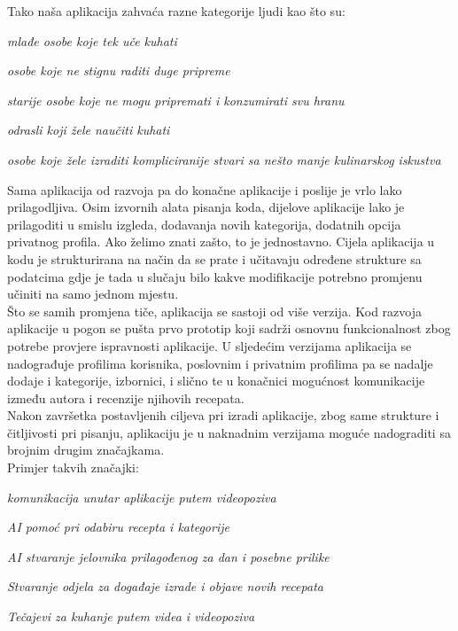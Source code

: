 		\noindent Tako naša aplikacija zahvaća razne kategorije ljudi kao što su:
		\begin{packed_item}
			\item \textit{mlađe osobe koje tek uče kuhati}
			\item \textit{osobe koje ne stignu raditi duge pripreme}
			\item \textit{starije osobe koje ne mogu pripremati i konzumirati svu hranu}
			\item \textit{odrasli koji žele naučiti kuhati}
			\item \textit{osobe koje žele izraditi kompliciranije stvari sa nešto manje kulinarskog iskustva}
		\end{packed_item}
		
		\noindent Sama aplikacija od razvoja pa do konačne aplikacije i poslije je vrlo lako prilagodljiva. Osim izvornih alata pisanja koda, dijelove aplikacije lako je prilagoditi u smislu izgleda, dodavanja novih kategorija, dodatnih opcija privatnog profila. Ako želimo znati zašto, to je jednostavno. Cijela aplikacija u kodu je strukturirana na način da se prate i učitavaju određene strukture sa podatcima gdje je tada u slučaju bilo kakve modifikacije potrebno promjenu učiniti na samo jednom mjestu.\\
		
		\noindent Što se samih promjena tiče, aplikacija se sastoji od više verzija. Kod razvoja aplikacije u pogon se pušta prvo prototip koji sadrži osnovnu funkcionalnost zbog potrebe provjere ispravnosti aplikacije. U sljedećim verzijama aplikacija se nadograđuje profilima korisnika, poslovnim i privatnim profilima pa se nadalje dodaje i kategorije, izbornici, i slično te u konačnici mogućnost komunikacije između autora i recenzije njihovih recepata. \\
		
		\noindent Nakon završetka postavljenih ciljeva pri izradi aplikacije, zbog same strukture i čitljivosti pri pisanju, aplikaciju je u naknadnim verzijama moguće nadograditi sa brojnim drugim značajkama.\\
		Primjer takvih značajki:
		
		\begin{packed_item}
			\item \textit{komunikacija unutar aplikacije putem videopoziva}
			\item \textit{AI pomoć pri odabiru recepta i kategorije}
			\item \textit{AI stvaranje jelovnika prilagođenog za dan i posebne prilike}
			\item \textit{Stvaranje odjela za događaje izrade i objave novih recepata}
			\item \textit{Tečajevi za kuhanje putem videa i videopoziva}
		\end{packed_item}
		
	
		
		
		
		\eject
		
	